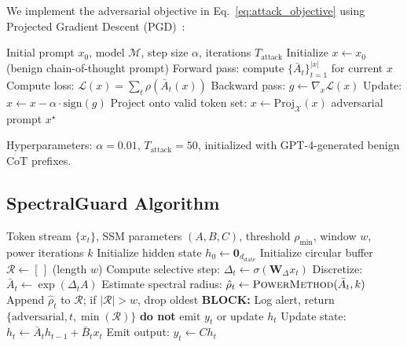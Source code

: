 \documentclass[10pt,twocolumn]{article}
\begin{document}
We implement the adversarial objective in Eq.~\eqref{eq:attack_objective} using Projected Gradient Descent (PGD)~\cite{madry2018towards}:

\begin{algorithm}[t]
\caption{Gradient-Based HiSPA (Spectral Collapse Attack)}
\label{alg:hispa}
\small
\begin{algorithmic}[1]
\Require Initial prompt $x_0$, model $\mathcal{M}$, step size $\alpha$, iterations $T_{\text{attack}}$
\State Initialize $x \gets x_0$ (benign chain-of-thought prompt)
    \State Forward pass: compute $\{\bar{A}_t\}_{t=1}^{|x|}$ for current $x$
    \State Compute loss: $\mathcal{L}(x) = \sum_{t} \rho(\bar{A}_t(x))$
    \State Backward pass: $g \gets \nabla_x \mathcal{L}(x)$
    \State Update: $x \gets x - \alpha \cdot \text{sign}(g)$
    \State Project onto valid token set: $x \gets \text{Proj}_{\mathcal{X}}(x)$
\EndFor
\State \Return adversarial prompt $x^\star$
\end{algorithmic}
\end{algorithm}

Hyperparameters: $\alpha=0.01$, $T_{\text{attack}}=50$, initialized with GPT-4-generated benign CoT prefixes.

\subsection{SpectralGuard Algorithm}

\begin{algorithm}[t]
\caption{SpectralGuard (Online Spectral Monitoring and Gating)}
\label{alg:spectralguard}
\small
\begin{algorithmic}[1]
\Require Token stream $\{x_t\}$, SSM parameters $(A,B,C)$, threshold $\rho_{\min}$, window $w$, power iterations $k$
\State Initialize hidden state $h_0 \gets \mathbf{0}_{d_{\text{state}}}$
\State Initialize circular buffer $\mathcal{R} \gets [\,]$ (length $w$)
    \State Compute selective step: $\Delta_t \gets \sigma(\mathbf{W}_\Delta x_t)$
    \State Discretize: $\bar{A}_t \gets \exp(\Delta_t A)$
    \State Estimate spectral radius: $\hat{\rho}_t \gets \textsc{PowerMethod}(\bar{A}_t, k)$
    \State Append $\hat{\rho}_t$ to $\mathcal{R}$; if $|\mathcal{R}| > w$, drop oldest
        \State \textbf{BLOCK:} Log alert, return $\{\text{adversarial}, t, \min(\mathcal{R})\}$
        \State \textbf{do not} emit $y_t$ or update $h_t$
    \Else
        \State Update state: $h_t \gets \bar{A}_t h_{t-1} + \bar{B}_t x_t$
        \State Emit output: $y_t \gets C h_t$
    \EndIf
\EndFor
\end{algorithmic}
\end{algorithm}
\end{document}
